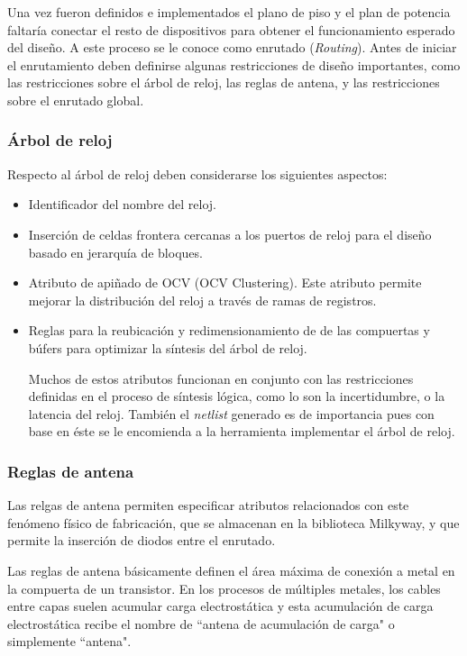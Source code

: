Una vez fueron definidos e implementados el plano de piso y el plan de potencia faltaría conectar el resto de dispositivos para obtener el funcionamiento esperado del diseño. A este proceso se le conoce como enrutado (\textit{Routing}). Antes de iniciar el enrutamiento deben definirse algunas restricciones de diseño importantes, como las restricciones sobre el árbol de reloj, las reglas de antena, y las restricciones sobre el enrutado global.

\subsubsection*{Árbol de reloj}

Respecto al árbol de reloj deben considerarse los siguientes aspectos:

\begin{itemize}
\item Identificador del nombre del reloj.
\item Inserción de celdas frontera cercanas a los puertos de reloj para el diseño basado en jerarquía de bloques.
\item Atributo de apiñado de OCV (OCV Clustering). Este atributo permite mejorar la distribución del reloj a través de ramas de registros.
\item Reglas para la reubicación y redimensionamiento de de las compuertas y búfers para optimizar la síntesis del árbol de reloj.

Muchos de estos atributos funcionan en conjunto con las restricciones definidas en el proceso de síntesis lógica, como lo son la incertidumbre, o la latencia del reloj. También el \textit{netlist} generado es de importancia pues con base en éste se le encomienda a la herramienta implementar el árbol de reloj.
\end{itemize}

\subsubsection*{Reglas de antena}

Las relgas de antena permiten especificar atributos relacionados con este fenómeno físico de fabricación, que se almacenan en la biblioteca Milkyway, y que permite la inserción de diodos entre el enrutado.

Las reglas de antena básicamente definen el área máxima de conexión a metal en la compuerta de un transistor. En los procesos de múltiples metales, los cables entre capas suelen acumular carga electrostática y esta acumulación de carga electrostática recibe el nombre de ``antena de acumulación de carga" o simplemente ``antena".

